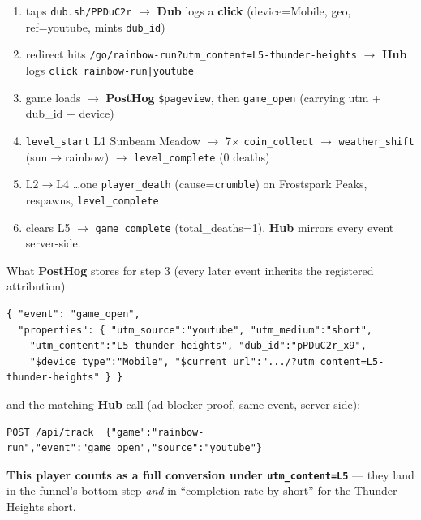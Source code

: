 \documentclass[11pt]{article}
\newcommand{\callout}[1]{\par\smallskip\noindent
  \colorbox{soft}{\parbox{\dimexpr\linewidth-2\fboxsep\relax}{\color{ink}#1}}\par\smallskip}
\newcommand{\Dub}{\textcolor{dub}{\textbf{Dub}}}
\newcommand{\PH}{\textcolor{ph}{\textbf{PostHog}}}
\newcommand{\Hub}{\textcolor{hub}{\textbf{Hub}}}
\begin{document}
\newcommand{\step}[2]{\item[\textcolor{#1}{$\bullet$}]}
\begin{enumerate}[leftmargin=2.2em,itemsep=1pt,topsep=2pt]
  \item[\textcolor{dub}{1.}] taps \texttt{dub.sh/PPDuC2r} $\to$ \Dub{} logs a \textbf{click} (device=Mobile, geo, ref=youtube, mints \texttt{dub\_id})
  \item[\textcolor{hub}{2.}] redirect hits \texttt{/go/rainbow-run?utm\_content=L5-thunder-heights} $\to$ \Hub{} logs \texttt{click rainbow-run|youtube}
  \item[\textcolor{ph}{3.}] game loads $\to$ \PH{} \texttt{\$pageview}, then \texttt{game\_open} (carrying utm + dub\_id + device)
  \item[\textcolor{ph}{4.}] \texttt{level\_start} L1 Sunbeam Meadow $\to$ 7$\times$ \texttt{coin\_collect} $\to$ \texttt{weather\_shift} (sun$\to$rainbow) $\to$ \texttt{level\_complete} (0 deaths)
  \item[\textcolor{ph}{5.}] L2$\to$L4 \ldots one \texttt{player\_death} (cause=\texttt{crumble}) on Frostspark Peaks, respawns, \texttt{level\_complete}
  \item[\textcolor{ph}{6.}] clears L5 $\to$ \texttt{game\_complete} (total\_deaths=1). \Hub{} mirrors every event server-side.
\end{enumerate}
\noindent What \PH{} stores for step 3 (every later event inherits the registered attribution):
\begin{lstlisting}[style=json]
{ "event": "game_open",
  "properties": { "utm_source":"youtube", "utm_medium":"short",
    "utm_content":"L5-thunder-heights", "dub_id":"pPDuC2r_x9",
    "$device_type":"Mobile", "$current_url":".../?utm_content=L5-thunder-heights" } }
\end{lstlisting}
\noindent and the matching \Hub{} call (ad-blocker-proof, same event, server-side):
\begin{lstlisting}[style=json]
POST /api/track  {"game":"rainbow-run","event":"game_open","source":"youtube"}
\end{lstlisting}
\callout{\textbf{This player counts as a full conversion under \texttt{utm\_content=L5}} --- they
land in the funnel's bottom step \emph{and} in ``completion rate by short'' for the Thunder
Heights short.}

\end{document}
